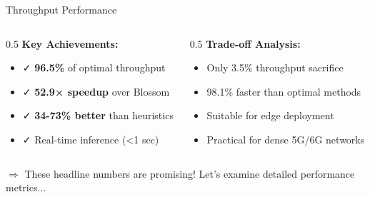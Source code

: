 \documentclass[aspectratio=169]{beamer}
\begin{document}
\begin{frame}{Throughput Performance}
   
    \vspace{-.2cm}
    \begin{columns}
        \begin{column}{0.5\textwidth}
            \textbf{Key Achievements:}
            \begin{itemize}
                \item ✓ \textbf{96.5\%} of optimal throughput
                \item ✓ \textbf{52.9× speedup} over Blossom
                \item ✓ \textbf{34-73\% better} than heuristics
                \item ✓ Real-time inference (<1 sec)
            \end{itemize}
        \end{column}
        \begin{column}{0.5\textwidth}
            \textbf{Trade-off Analysis:}
            \begin{itemize}
                \item Only 3.5\% throughput sacrifice
                \item 98.1\% faster than optimal methods
                \item Suitable for edge deployment
                \item Practical for dense 5G/6G networks
            \end{itemize}
        \end{column}
    \end{columns}
    
    \vspace{0.2cm}
    \small \textcolor{iiitblue}{$\Rightarrow$ These headline numbers are promising! Let's examine detailed performance metrics...}
\end{frame}
\end{document}
